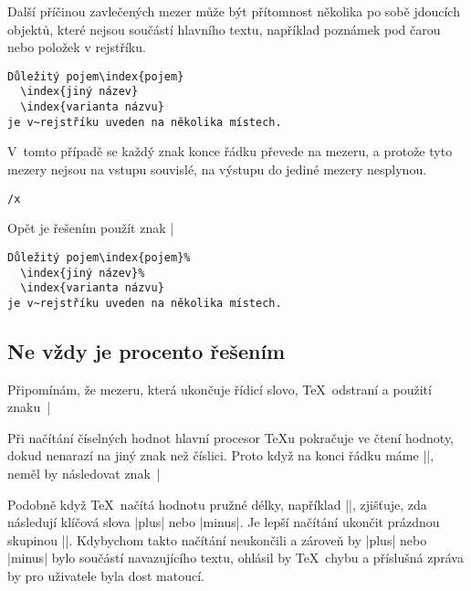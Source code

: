 \documentclass{csbulletin}
\def\p#1{\texttt{\char`\\#1}}
\begin{document}
Další příčinou zavlečených mezer může být přítomnost několika po sobě jdoucích objektů, které nejsou součástí hlavního textu, například poznámek pod čarou nebo položek v rejstříku.
\begin{Verbatim}
Důležitý pojem\index{pojem}
  \index{jiný název}
  \index{varianta názvu}
je v~rejstříku uveden na několika místech.
\end{Verbatim}
V~tomto případě se každý znak konce řádku převede na mezeru, a protože tyto mezery nejsou na vstupu souvislé, na výstupu do jediné mezery nesplynou.
\begingroup
\def\x{\hbox{\rm
Důležitý pojem\index{pojem}\
  \index{jiný název}\
  \index{varianta názvu}\
je v~rejstříku uveden na několika místech.
\unskip}}%
\begin{Verbatim}[commandchars=/()]
/x
\end{Verbatim}
\endgroup
\noindent
Opět je řešením použít znak |%
\begin{Verbatim}
Důležitý pojem\index{pojem}%
  \index{jiný název}%
  \index{varianta názvu}
je v~rejstříku uveden na několika místech.
\end{Verbatim}

\subsection{Ne vždy je procento řešením}

Připomínám, že mezeru, která ukončuje řídicí slovo, \TeX\ odstraní a použití znaku~|%

Při načítání číselných hodnot hlavní procesor \TeX u pokračuje ve čtení hodnoty, dokud nenarazí na jiný znak než číslici. Proto když na konci řádku máme ||, neměl by následovat znak~|%

Podobně když \TeX\ načítá hodnotu pružné délky, například |\parskip=2pc|, zjišťuje, zda následují klíčová slova |plus| nebo |minus|. Je lepší načítání ukončit prázdnou skupinou |{}|. Kdybychom takto načítání neukončili a zároveň by |plus| nebo |minus| bylo součástí navazujícího textu, ohlásil by \TeX\ chybu a příslušná zpráva by pro uživatele byla dost matoucí.
\end{document}
